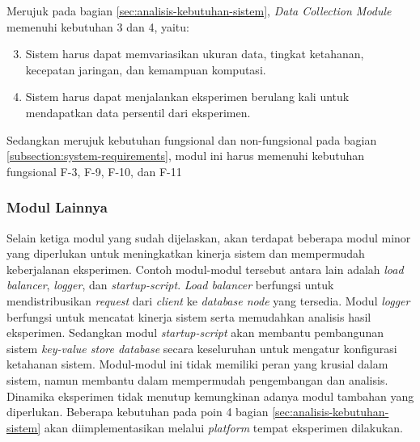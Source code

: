 Merujuk pada bagian \ref{sec:analisis-kebutuhan-sistem}, \textit{Data Collection Module} memenuhi kebutuhan 3 dan 4, yaitu:

\begin{enumerate}
    \setcounter{enumi}{2}
    \item Sistem harus dapat memvariasikan ukuran data, tingkat ketahanan, kecepatan jaringan, dan kemampuan komputasi.
    \item Sistem harus dapat menjalankan eksperimen berulang kali untuk mendapatkan data persentil dari eksperimen.
\end{enumerate}

Sedangkan merujuk kebutuhan fungsional dan non-fungsional pada bagian \ref{subsection:system-requirements}, modul ini harus memenuhi kebutuhan fungsional F-3, F-9, F-10, dan F-11

\subsubsection{Modul Lainnya}
\label{subsubsection:other-modules}

Selain ketiga modul yang sudah dijelaskan, akan terdapat beberapa modul minor yang diperlukan untuk meningkatkan kinerja sistem dan mempermudah keberjalanan eksperimen. Contoh modul-modul tersebut antara lain adalah \textit{load balancer}, \textit{logger}, dan \textit{startup-script}. \textit{Load balancer} berfungsi untuk mendistribusikan \textit{request} dari \textit{client} ke \textit{database node} yang tersedia. Modul \textit{logger} berfungsi untuk mencatat kinerja sistem serta memudahkan analisis hasil eksperimen. Sedangkan modul \textit{startup-script} akan membantu pembangunan sistem \textit{key-value store database} secara keseluruhan untuk mengatur konfigurasi ketahanan sistem. Modul-modul ini tidak memiliki peran yang krusial dalam sistem, namun membantu dalam mempermudah pengembangan dan analisis. Dinamika eksperimen tidak menutup kemungkinan adanya modul tambahan yang diperlukan. Beberapa kebutuhan pada poin 4 bagian \ref{sec:analisis-kebutuhan-sistem} akan diimplementasikan melalui \textit{platform} tempat eksperimen dilakukan.
